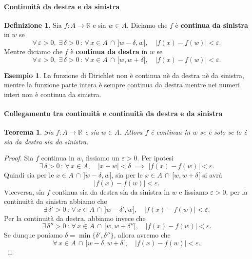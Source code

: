 \documentclass{article}
\theoremstyle{plain}
\newtheorem{thm}{Teorema}[section]
\theoremstyle{definition}
\newtheorem{defn}{Definizione}[section]
\newtheorem{exmp}{Esempio}[section]
\theoremstyle{remark}
\begin{document}
\vspace{10pt}

\paragraph{Continuità da destra e da sinistra}
\begin{bxthm}
\begin{defn}
    Sia $f:A\to\mathbb{R}$ e sia $w\in A$.
    Diciamo che $f$ è \textbf{continua da sinistra} in $w$ se 
    \[\forall\, \varepsilon>0,\;\exists\,\delta>0\,:\,\forall\,x\in A\,\cap\,]w-\delta,w],\quad |f(x)-f(w)|<\varepsilon.\]
    Mentre diciamo che $f$ è \textbf{continua da destra} in $w$ se 
    \[\forall\, \varepsilon>0,\;\exists\,\delta>0\,:\,\forall\,x\in A\,\cap\,[w,w+\delta[,\quad |f(x)-f(w)|<\varepsilon.\]
\end{defn}
\end{bxthm}

\vspace{10pt}

\begin{exmp}
    La funzione di Dirichlet non è continua nè da destra nè da sinistra, mentre la funzione parte intera è sempre continua da destra mentre nei numeri interi non è continua da sinistra. 
\end{exmp}

\vspace{10pt}

\paragraph{Collegamento tra continuità e continuità da destra e da sinistra}
\begin{bxthm}
\begin{thm}
    Sia $f:A\to\mathbb{R}$ e sia $w\in A$. 
    Allora $f$ è continua in $w$ se e solo se lo è sia da destra sia da sinistra.
\end{thm}
\end{bxthm}
\begin{proof}
    Sia $f$ continua in $w$, fissiamo un $\varepsilon >0$.
    Per ipotesi 
    \[\exists\,\delta>0\,:\,\forall\, x\in A,\quad |x-w|<\delta\;\implies\; |f(x)-f(w)|<\varepsilon.\]
    Quindi sia per le $x\in A\,\cap\,]w-\delta,w] $, sia per le $x\in A\,\cap\, [w,w+\delta[$ si avrà \[|f(x)-f(w)|<\varepsilon.\]
    Viceversa, sia $f$ continua sia da destra sia da sinistra in $w$ e fissiamo $\varepsilon>0$, per la continuità da sinistra abbiamo che 
    \[\exists\,\delta'>0\,:\,\forall\, x\in A\,\cap\,]w-\delta',w] ,\quad |f(x)-f(w)|<\varepsilon.\]
    Per la continuità da destra, abbiamo invece che
    \[\exists\,\delta''>0\,:\,\forall\, x\in A\,\cap\, [w,w+\delta''[,\quad|f(x)-f(w)|<\varepsilon.\]
    Se dunque poniamo $\delta=\min\{\delta',\delta''\}$, allora avremo che 
    \[\forall\, x\in A\,\cap\, ]w-\delta,w+\delta[,\quad|f(x)-f(w)|<\varepsilon.\]
\end{proof}
\end{document}
